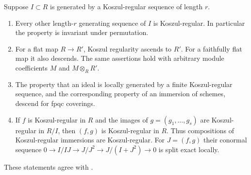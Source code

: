 \begin{theorem}\label{SA23-C-3}
Suppose $I\subset R$ is generated by a Koszul-regular sequence of
length $r$.
\begin{enumerate}
\item Every other length-$r$ generating sequence of $I$ is
Koszul-regular.  In particular the property is invariant under
permutation.
\item For a flat map $R\to R'$, Koszul regularity ascends to $R'$.
For a faithfully flat map it also descends.  The same assertions hold
with arbitrary module coefficients $M$ and $M\otimes_R R'$.
\item The property that an ideal is locally generated by a finite
Koszul-regular sequence, and the corresponding property of an immersion
of schemes, descend for fpqc coverings.
\item If $f$ is Koszul-regular in $R$ and the images of
$g=(g_1,\ldots,g_s)$ are Koszul-regular in $R/I$, then $(f,g)$ is
Koszul-regular in $R$.  Thus compositions of Koszul-regular immersions
are Koszul-regular.  For $J=(f,g)$ their conormal sequence
$0\to I/IJ\to J/J^2\to J/(I+J^2)\to0$ is split exact locally.
\end{enumerate}
These statements agree with \cite[VII, 1.4.2--1.5 and
Proposition 1.7(i), pp.~419--423]{algSGA6}.
\end{theorem}
